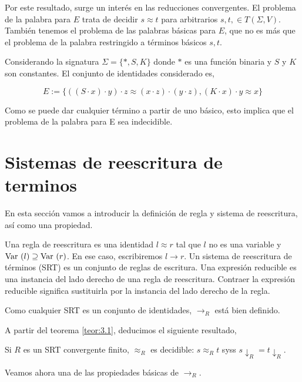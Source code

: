 Por este resultado, surge un interés en las reducciones convergentes.
El problema de la palabra para $E$ trata de decidir $s \approx t$ para
arbitrarios $s,t, \in T(\Sigma, V)$. También tenemos el problema de
las palabras básicas para $E$, que no es más que el problema de la
palabra restringido a términos básicos $s,t$.

\begin{ejem}
  Considerando la signatura $\Sigma = \{*, S, K\}$ donde $*$ es una
  función binaria y $S$ y $K$ son constantes. El conjunto de
  identidades considerado es,

  \[E := \{((S \cdot x) \cdot y) \cdot z \approx (x \cdot z) \cdot (y
    \cdot z),(K \cdot x) \cdot y \approx x \} \]

  Como se puede dar cualquier término a partir de uno básico, esto
  implica que el problema de la palabra para E sea indecidible.
\end{ejem}

\section{Sistemas de reescritura de terminos}

En esta sección vamos a introducir la definición de regla y sistema de
reescritura, así como una propiedad.

\begin{defi}
  Una regla de reescritura es una identidad $l \approx r$ tal que $l$
  no es una variable y $\mbox{Var }(l) \supseteq \mbox{Var }(r)$. En ese caso,
  escribiremos $l \rightarrow r$. Un sistema de reescritura de
  términos (SRT) es un conjunto de reglas de escritura. Una expresión
  reducible es una instancia del lado derecho de una regla de
  reescritura. Contraer la expresión reducible significa sustituirla
  por la instancia del lado derecho de la regla.
\end{defi}

Como cualquier SRT es un conjunto de identidades, $\rightarrow_R$ está
bien definido.

A partir del teorema \ref{teor:3.1}, deducimos el siguiente resultado,

\begin{teor}
  Si $R$ es un SRT convergente finito, $\approx_R$ es decidible: $s
  \approx_R t$ syss $s \downarrow_R = t \downarrow_R$.
\end{teor}

Veamos ahora una de las propiedades básicas de $\rightarrow_R$.

